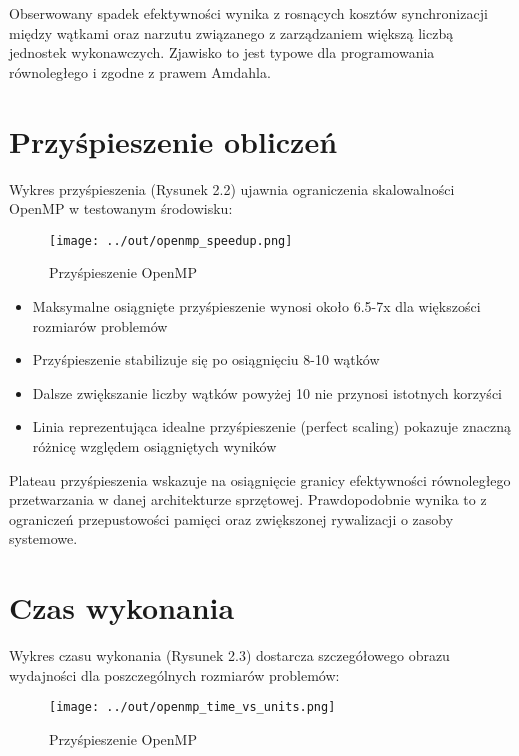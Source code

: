 \documentclass[12pt,a4paper]{report}
\begin{document}
Obserwowany spadek efektywności wynika z rosnących kosztów synchronizacji między wątkami oraz narzutu związanego z zarządzaniem większą liczbą jednostek wykonawczych. Zjawisko to jest typowe dla programowania równoległego i zgodne z prawem Amdahla.

\section{Przyśpieszenie obliczeń}

Wykres przyśpieszenia (Rysunek 2.2) ujawnia ograniczenia skalowalności OpenMP w testowanym środowisku:

\begin{figure}[h]
    \centering
    \texttt{[image: ../out/openmp\_speedup.png]}
    \caption{Przyśpieszenie OpenMP}
    \label{fig:etykieta}
\end{figure}

\begin{itemize}
    \item Maksymalne osiągnięte przyśpieszenie wynosi około 6.5-7x dla większości rozmiarów problemów
    \item Przyśpieszenie stabilizuje się po osiągnięciu 8-10 wątków
    \item Dalsze zwiększanie liczby wątków powyżej 10 nie przynosi istotnych korzyści
    \item Linia reprezentująca idealne przyśpieszenie (perfect scaling) pokazuje znaczną różnicę względem osiągniętych wyników
\end{itemize}

Plateau przyśpieszenia wskazuje na osiągnięcie granicy efektywności równoległego przetwarzania w danej architekturze sprzętowej. Prawdopodobnie wynika to z ograniczeń przepustowości pamięci oraz zwiększonej rywalizacji o zasoby systemowe.

\section{Czas wykonania}

Wykres czasu wykonania (Rysunek 2.3) dostarcza szczegółowego obrazu wydajności dla poszczególnych rozmiarów problemów:

\begin{figure}[h]
    \centering
    \texttt{[image: ../out/openmp\_time\_vs\_units.png]}
    \caption{Przyśpieszenie OpenMP}
    \label{fig:etykieta}
\end{figure}
\end{document}

